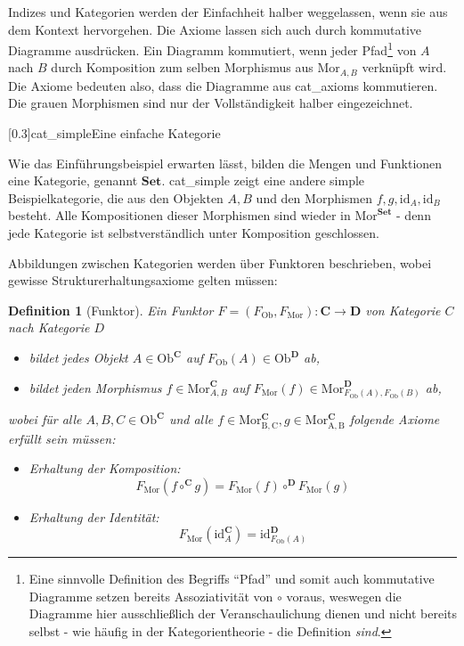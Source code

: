 \documentclass[a4paper, bibgerm]{article}
\newcommand\abb{}
\newcommand\fig{}
\newtheorem{defi}{Definition}
\begin{document}
Indizes und Kategorien werden der Einfachheit halber weggelassen, wenn
sie aus dem Kontext hervorgehen. Die Axiome lassen sich auch durch
kommutative Diagramme ausdrücken. Ein Diagramm kommutiert, wenn jeder
Pfad\footnote{Eine sinnvolle Definition des Begriffs "`Pfad"' und somit
  auch kommutative Diagramme setzen bereits Assoziativität von $\circ$
  voraus, weswegen die Diagramme hier ausschließlich der
  Veranschaulichung dienen und nicht bereits selbst - wie häufig in der
  Kategorientheorie - die Definition \textit{sind}.}  von $A$ nach $B$
durch Komposition zum selben Morphismus aus $\mathrm{Mor}_{A,B}$
verknüpft wird. Die Axiome bedeuten also, dass die Diagramme aus
\abb{cat_axioms} kommutieren. Die grauen Morphismen sind nur der
Vollständigkeit halber eingezeichnet.

\fig[0.3]{cat_simple}{Eine einfache Kategorie}

Wie das Einführungsbeispiel erwarten lässt, bilden die Mengen und
Funktionen eine Kategorie, genannt $\mathbf{Set}$. \abb{cat_simple} zeigt eine
andere simple Beispielkategorie, die aus den Objekten $A, B$ und den
Morphismen $f, g, \mathrm{id}_A, \mathrm{id}_B$ besteht. Alle Kompositionen
dieser Morphismen sind wieder in $\mathrm{Mor}^{\mathbf{Set}}$ - denn
jede Kategorie ist selbstverständlich unter Komposition geschlossen.

Abbildungen zwischen Kategorien werden über Funktoren beschrieben, wobei
gewisse Strukturerhaltungsaxiome gelten müssen:

\begin{defi}[Funktor]
Ein Funktor $F=(F_{\mathrm{Ob}},F_{\mathrm{Mor}}) : \mathbf{C}
\rightarrow \mathbf{D}$ von Kategorie $C$ nach Kategorie $D$  
    \begin{itemize}
    \item bildet jedes Objekt $A \in \mathrm{Ob}^{\mathbf{C}}$ auf $F_{\mathrm{Ob}}(A) \in
      \mathrm{Ob}^{\mathbf{D}}$ ab, 
    \item bildet jeden Morphismus $f \in
      \mathrm{Mor}^{\mathbf{C}}_{A,B}$ auf $F_{\mathrm{Mor}}(f) \in
      \mathrm{Mor}^{\mathbf{D}}_{F_{\mathrm{Ob}}(A),F_{\mathrm{Ob}}(B)}$
      ab,
    \end{itemize}   
    wobei für alle $A,B,C \in \mathrm{Ob}^{\mathbf{C}}$ und alle $f \in
    \mathrm{Mor^{\mathbf{C}}_{B,C}},g \in
    \mathrm{Mor^{\mathbf{C}}_{A,B}}$ folgende Axiome erfüllt sein 
    müssen: 
    \begin{itemize}
    \item Erhaltung der Komposition:
      $$F_{\mathrm{Mor}}(f \circ^{\mathbf{C}} g) =
      F_{\mathrm{Mor}}(f) \circ^{\mathbf{D}} F_{\mathrm{Mor}}(g)$$
    \item Erhaltung der Identität:
      $$F_{\mathrm{Mor}}(\mathrm{id}^{\mathbf{C}}_A) =
      \mathrm{id}^{\mathbf{D}}_{F_{\mathrm{Ob}}(A)}$$
    \end{itemize}
\end{defi}
\end{document}
